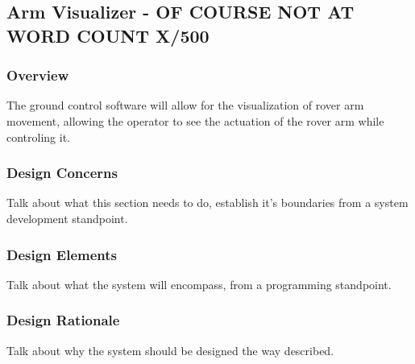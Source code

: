\subsection{Arm Visualizer - OF COURSE NOT AT WORD COUNT X/500}
\subsubsection{Overview}
The ground control software will allow for the visualization of rover arm movement, allowing the operator to see the actuation of the rover arm while controling it.

\subsubsection{Design Concerns}
Talk about what this section needs to do, establish it's boundaries from a system development standpoint.

\subsubsection{Design Elements}
Talk about what the system will encompass, from a programming standpoint.

\subsubsection{Design Rationale}
Talk about why the system should be designed the way described.
